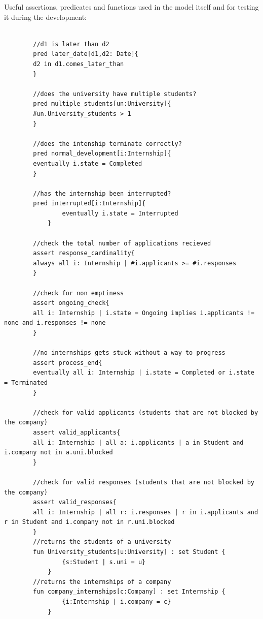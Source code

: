 Useful assertions, predicates and functions used in the model itself and for testing it during the development:

\begin{lstlisting}[language=Alloy]
    
        //d1 is later than d2
        pred later_date[d1,d2: Date]{
        d2 in d1.comes_later_than
        }
        
        //does the university have multiple students?
        pred multiple_students[un:University]{
        #un.University_students > 1
        }
        
        //does the intenship terminate correctly?
        pred normal_development[i:Internship]{
        eventually i.state = Completed
        }
        
        //has the internship been interrupted?
        pred interrupted[i:Internship]{
                eventually i.state = Interrupted
            }
        
        //check the total number of applications recieved
        assert response_cardinality{
        always all i: Internship | #i.applicants >= #i.responses
        }
        
        //check for non emptiness
        assert ongoing_check{
        all i: Internship | i.state = Ongoing implies i.applicants != none and i.responses != none
        }
        
        //no internships gets stuck without a way to progress
        assert process_end{
        eventually all i: Internship | i.state = Completed or i.state = Terminated
        }
        
        //check for valid applicants (students that are not blocked by the company)
        assert valid_applicants{
        all i: Internship | all a: i.applicants | a in Student and i.company not in a.uni.blocked
        }
        
        //check for valid responses (students that are not blocked by the company)
        assert valid_responses{
        all i: Internship | all r: i.responses | r in i.applicants and r in Student and i.company not in r.uni.blocked
        }
        //returns the students of a university
        fun University_students[u:University] : set Student {
                {s:Student | s.uni = u}
            }
        //returns the internships of a company
        fun company_internships[c:Company] : set Internship {
                {i:Internship | i.company = c}
            }
        
\end{lstlisting}

